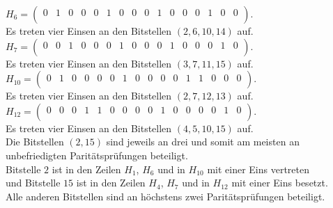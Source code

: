\begin{Beispiel}
        
        $H_6= \left( \begin{array}{rrrrrrrrrrrrrrrr}
            0 & 1 & 0 & 0 & 0 & 1 & 0 & 0 & 0 & 1 & 0 & 0 & 0 & 1 & 0 & 0 \\
           \end{array}\right). 
        $\\
        Es treten vier Einsen an den Bitstellen $(2, 6, 10, 14)$ auf.\\
        
        $H_7= \left( \begin{array}{rrrrrrrrrrrrrrrr}
            0 & 0 & 1 & 0 & 0 & 0 & 1 & 0 & 0 & 0 & 1 & 0 & 0 & 0 & 1 & 0 \\
           \end{array}\right). 
        $\\
        Es treten vier Einsen an den Bitstellen $(3, 7, 11, 15)$ auf.\\
        
        $H_{10}= \left( \begin{array}{rrrrrrrrrrrrrrrr}
            0 & 1 & 0 & 0 & 0 & 0 & 1 & 0 & 0 & 0 & 0 & 1 & 1 & 0 & 0 & 0 \\
           \end{array}\right). 
        $\\
        Es treten vier Einsen an den Bitstellen $(2, 7, 12, 13)$ auf.\\
        
        $H_{12}= \left( \begin{array}{rrrrrrrrrrrrrrrr}
            0 & 0 & 0 & 1 & 1 & 0 & 0 & 0 & 0 & 1 & 0 & 0 & 0 & 0 & 1 & 0 \\
           \end{array}\right). 
        $\\
        Es treten vier Einsen an den Bitstellen $(4, 5, 10, 15)$ auf.\\
        
        
        Die Bitstellen $(2, 15)$ sind jeweils an drei und somit am meisten an unbefriedigten Paritätsprüfungen beteiligt.\\ 
        Bitstelle $2$ ist in den Zeilen $H_1$, $H_6$ und in $H_{10}$ mit einer Eins vertreten\\ 
        und Bitstelle $15$ ist in den Zeilen $H_4$, $H_7$ und in $H_{12}$ mit einer Eins besetzt.\\
        Alle anderen Bitstellen sind an höchstens zwei Paritätsprüfungen beteiligt.\\
         

\end{Beispiel}
